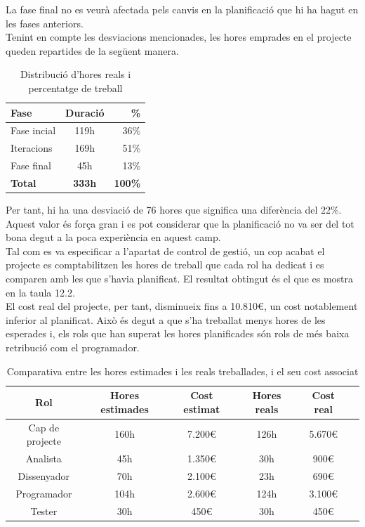 La fase final no es veurà afectada pels canvis en la planificació que hi ha hagut en les fases anteriors.\\

Tenint en compte les desviacions mencionades, les hores emprades en el projecte queden repartides de la següent manera.

\begin{table}[!h]
\centering
\begin{tabular}{|l|c|r|}
\hline
\textbf{Fase} & \textbf{Duració} & \textbf{\%} \\\hline
Fase incial & 119h & 36\% \\\hline
Iteracions & 169h & 51\% \\\hline
Fase final & 45h & 13\% \\\hline
\textbf{Total} & \textbf{333h} & \textbf{100\%} \\\hline
\end{tabular}
\label{}
\caption{Distribució d'hores reals i percentatge de treball}
\end{table}

Per tant, hi ha una desviació de 76 hores que significa una diferència del 22\%. Aquest valor és força gran i es pot considerar que la planificació no va ser del
tot bona degut a la poca experiència en aquest camp.\\

Tal com es va especificar a l'apartat de control de gestió, un cop acabat el projecte es comptabilitzen les hores de treball que cada rol ha dedicat i es comparen amb les que s'havia planificat. El resultat obtingut és el que es mostra en la
taula 12.2.\\

El cost real del projecte, per tant, disminueix fins a 10.810\euro, un cost notablement inferior al planificat. Això és degut a que s'ha treballat menys hores de
les esperades i, els rols que han superat les hores planificades són rols de més
baixa retribució com el programador.

\begin{table}[!h]
\centering
\begin{tabular}{|c|c|c|c|c|c|}
\hline
\textbf{Rol} & \textbf{Hores estimades} & \textbf{Cost estimat} & \textbf{Hores reals} & \textbf{Cost real} \\ \hline
Cap de projecte & 160h & 7.200\euro & 126h & 5.670\euro \\\hline
Analista & 45h & 1.350\euro & 30h & 900\euro \\\hline
Dissenyador & 70h & 2.100\euro & 23h & 690\euro \\\hline
Programador & 104h & 2.600\euro & 124h & 3.100\euro \\\hline
Tester & 30h & 450\euro & 30h & 450\euro \\\hline
\end{tabular}
\label{}
\caption{Comparativa entre les hores estimades i les reals treballades, i el seu cost associat}
\end{table}


